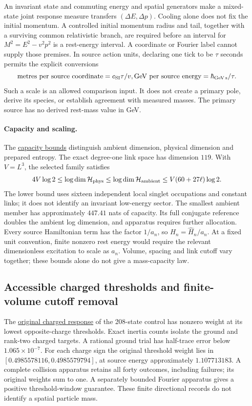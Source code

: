 An invariant state and commuting energy and spatial generators make a
mixed-state joint response measure transfers $(\Delta E,\Delta p)$.
Cooling alone does not fix the initial momentum. A controlled initial
momentum radius and tail, together with a surviving common relativistic
branch, are required before an interval for
$M^2=E^2-v^2p^2$ is a rest-energy interval. A coordinate or Fourier
label cannot supply those premises. In source action units, declaring
one tick to be $\tau$ seconds permits the explicit conversions
\[
 \text{metres per source coordinate}=c_{\rm SI}\tau/v,
 \text{GeV per source energy}=\hbar_{\rm GeV\,s}/\tau.
\]
Such a scale is an allowed comparison input. It does not create a
primary pole, derive its species, or establish agreement with measured
masses. The primary source has no derived rest-mass value in GeV.

\paragraph{Capacity and scaling.}
The \href{https://github.com/FloatingPragma/observer-patch-holography/blob/main/model/particle_primary_capacity/PROOF.md}{capacity bounds}
distinguish ambient dimension, physical dimension and prepared entropy.
The exact degree-one link space has dimension $119$. With $V=L^3$,
the selected family satisfies
\[
 4V\log2\le\log\dim\mathcal H_{\rm phys}
 \le\log\dim\mathcal H_{\rm ambient}
 \le V(60+27\ell)\log2.
\]
The lower bound uses sixteen independent local singlet occupations and
constant links; it does not identify an invariant low-energy sector.
The smallest ambient member has approximately $447.41$ nats of capacity.
Its full conjugate reference doubles the ambient log dimension, and
apparatus requires further allocation. Every source Hamiltonian term
has the factor $1/a_n$, so $H_n=\widehat H_n/a_n$. At a fixed unit
convention, finite nonzero rest energy would require the relevant
dimensionless excitation to scale as $a_n$. Volume, spacing and link
cutoff vary together; these bounds alone do not give a mass-capacity law.

\subsection{Accessible charged thresholds and finite-volume cutoff removal}

The \href{https://github.com/FloatingPragma/observer-patch-holography/blob/main/model/particle_charged_residue/PROOF.md}{original charged response}
of the 208-state control has nonzero weight at its lowest opposite-charge
thresholds. Exact inertia counts isolate the ground and rank-two charged
targets. A rational ground trial has half-trace error below
$1.065\times10^{-7}$. For each charge sign the original threshold weight
lies in $[0.4985578116,0.4985579794]$, at source energy approximately
$1.107713183$. A complete collision apparatus retains all forty outcomes,
including failures; its original weights sum to one. A separately bounded
Fourier apparatus gives a positive threshold-window guarantee. These
finite directional records do not identify a spatial particle mass.

